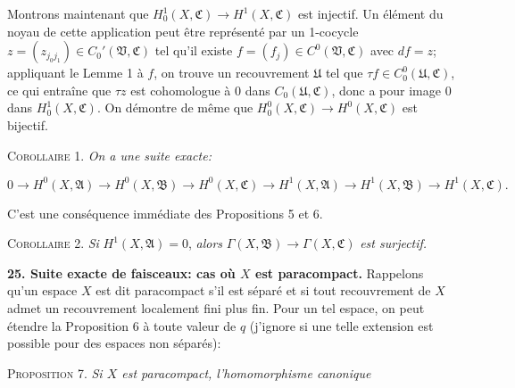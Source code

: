 Montrons maintenant que $H_0^1(X, \mathfrak{C}) \rightarrow H^1(X, \mathfrak{C})$ est injectif. Un élément du noyau de cette application peut être représenté par un 1-cocycle $z = (z_{j_0 j_1}) \in C_0'(\mathfrak{V}, \mathfrak{C})$ tel qu'il existe $f = (f_j) \in C^0(\mathfrak{V}, \mathfrak{C})$ avec $df = z$; appliquant le Lemme 1 à $f$, on trouve un recouvrement $\mathfrak{U}$ tel que $\tau f \in C_0^0(\mathfrak{U}, \mathfrak{C})$, ce qui entraîne que $\tau z$ est cohomologue à $0$ dans $C_0(\mathfrak{U}, \mathfrak{C})$, donc a pour image 0 dans $H_0^1(X, \mathfrak{C})$. On démontre de même que $H_0^0(X, \mathfrak{C}) \rightarrow H^0(X, \mathfrak{C})$ est bijectif.

\textsc{Corollaire} 1. \textit{On a une suite exacte:}

\begin{equation*}
0 \rightarrow H^0(X, \mathfrak{A}) \rightarrow H^0(X, \mathfrak{B}) \rightarrow H^0(X, \mathfrak{C}) \rightarrow H^1(X, \mathfrak{A}) \rightarrow H^1(X, \mathfrak{B}) \rightarrow H^1(X, \mathfrak{C}).
\end{equation*}

C'est une conséquence immédiate des Propositions 5 et 6.

\textsc{Corollaire} 2. \textit{Si} $H^1(X, \mathfrak{A}) = 0$, \textit{alors} $\Gamma(X, \mathfrak{B}) \rightarrow \Gamma(X, \mathfrak{C})$ \textit{est surjectif.}

\textbf{25. Suite exacte de faisceaux: cas où $X$ est paracompact.} Rappelons qu'un espace $X$ est dit paracompact s'il est séparé et si tout recouvrement de $X$ admet un recouvrement localement fini plus fin. Pour un tel espace, on peut étendre la Proposition 6 à toute valeur de $q$ (j'ignore si une telle extension est possible pour des espaces non séparés):



%
%
%
\textsc{Proposition} 7. \textit{Si $X$ est paracompact, l'homomorphisme canonique}

